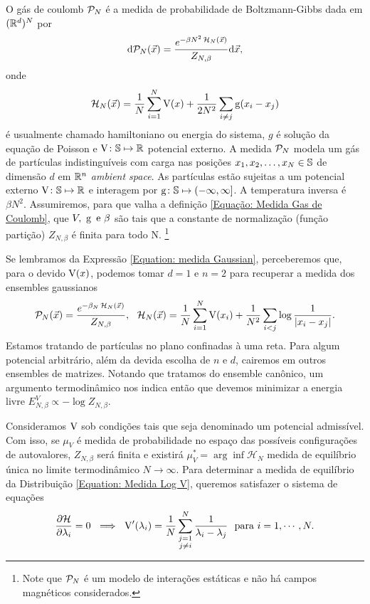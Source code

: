 \documentclass[12pt]{report}
\begin{document}
O gás de coulomb $\mathcal{P}_N$ é a medida de probabilidade de Boltzmann-Gibbs dada em $(\mathbb{R}^d)^N$ por 
\begin{equation}
	\mathrm{d} \mathcal{P}_N(\vec{x}) = \frac{e^{-\beta N^2 \operatorname{\mathcal{H}}_N(\vec{x})}}{Z_{N,\beta}} \mathrm{d} \vec{x},
	\label{Equação: Medida Gas de Coulomb}
\end{equation}
onde $$\operatorname{\mathcal{H}}_N(\vec{x}) = \frac{1}{N} \sum_{i = 1}^{N} \operatorname{V}(x) + \frac{1}{2N^2} \sum_{i \neq j} \operatorname{g}(x_i - x_j)$$ é usualmente chamado hamiltoniano ou energia do sistema, $g$ é solução da equação de Poisson e $\operatorname{V} \colon \mathbb{S} \mapsto \mathbb{R}$ potencial externo. \cite{ChafaCoulombMeasure} A medida $\mathcal{P}_N$ modela um gás de partículas indistinguíveis com carga nas posições $x_1, x_2, \dots, x_N \in \mathbb{S}$ de dimensão $d$ em $\mathbb{R}^n$ \textit{ambient space}. As partículas estão sujeitas a um potencial externo $\operatorname{V} \colon \mathbb{S} \mapsto \mathbb{R}$ e interagem por $\operatorname{g} \colon \mathbb{S} \mapsto (-\infty, \infty]$. A temperatura inversa é $\beta N^2$. Assumiremos, para que valha a definição \eqref{Equação: Medida Gas de Coulomb}, que $V, \ \g \ \text{e} \ \beta$ são tais que a constante de normalização (função partição) $Z_{N, \beta}$ é finita para todo N. \footnote{Note que $\mathcal{P}_N$ é um modelo de interações estáticas e não há campos magnéticos considerados.}

Se lembramos da Expressão \eqref{Equation: medida Gaussian}, perceberemos que, para o devido $\operatorname{V}(x)$, podemos tomar $d=1$ e $n = 2$ para recuperar a medida dos ensembles gaussianos 
\begin{equation}
	\mathcal{P}_N(\vec{x}) = \frac{e^{-\beta_N \operatorname{\mathcal{H}}_N(\vec{x})}}{Z_{N,\beta}}, \ \ \operatorname{\mathcal{H}}_N(\vec{x}) = \frac{1}{N} \sum_{i = 1}^{N} \operatorname{V}(x_i) + \frac{1}{N^2} \sum_{i < j} \log{\frac{1}{|x_i - x_j|}}.
	\label{Equation: Medida Log V}
\end{equation}
Estamos tratando de partículas no plano confinadas à uma reta. Para algum potencial arbitrário, além da devida escolha de $n$ e $d$, cairemos em outros ensembles de matrizes. Notando que tratamos do ensemble canônico, um argumento termodinâmico nos indica então que devemos minimizar a energia livre $E^V_{N,\beta} \propto - \log{Z_{N, \beta}}.$

Consideramos $\operatorname{V}$ sob condições tais que seja denominado um potencial admissível. \cite{ChafaCoulombMeasure} Com isso, se $\mu_{V}$ é medida de probabilidade no espaço das possíveis configurações de autovalores, $Z_{N, \beta}$ será finita e existirá $\mu_{V}^* = \arg \inf {\mathcal{H}_N}$ medida de equilíbrio única no limite termodinâmico $N \rightarrow \infty$. Para determinar a medida de equilíbrio da Distribuição \eqref{Equation: Medida Log V}, \cite{RMT-firstcourse-Potters} queremos satisfazer o sistema de equações
\begin{equation}
	\frac{\partial \mathcal{H}}{\partial \lambda_i} = 0 \ \implies \ \operatorname{V}'(\lambda_i) = \frac{1}{N} \sum_{\substack{j=1 \\ j \neq i}}^{N} \frac{1}{\lambda_i - \lambda_j} \ \ \text{para} \ i = 1, \cdots, N.
	\label{Equação: Sistema minimizante}
\end{equation} 
\end{document}
